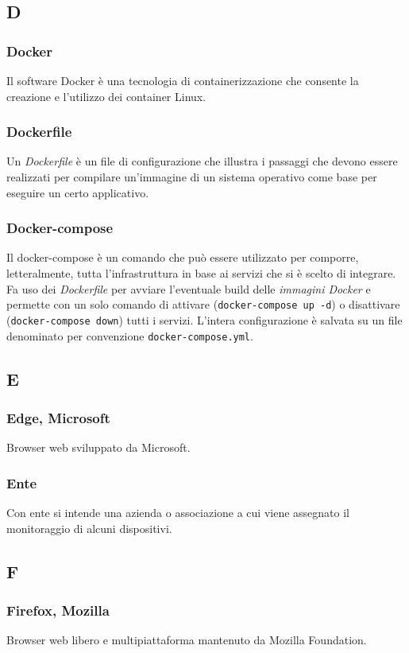 \subsection{D}
\subsubsection{Docker}  Il software Docker è una tecnologia di containerizzazione che consente la creazione e l'utilizzo dei container Linux.
\subsubsection{Dockerfile}  Un \textit{Dockerfile} è un file di configurazione che illustra i passaggi che devono essere realizzati per compilare un'immagine di un sistema operativo come base per eseguire un certo applicativo.
\subsubsection{Docker-compose}  Il docker-compose è un comando che può essere utilizzato per comporre, letteralmente, tutta l'infrastruttura in base ai servizi che si è scelto di integrare. Fa uso dei \textit{Dockerfile} per avviare l'eventuale build delle \textit{immagini Docker} e permette con un solo comando di attivare (\verb!docker-compose up -d!) o disattivare (\verb!docker-compose down!) tutti i servizi. L'intera configurazione è salvata su un file denominato per convenzione \verb!docker-compose.yml!.
\subsection{E}
\subsubsection*{Edge, Microsoft}
Browser web sviluppato da Microsoft.
\subsubsection*{Ente}
Con ente si intende una azienda o associazione a cui viene assegnato il monitoraggio di alcuni dispositivi.
\subsection{F}
\subsubsection*{Firefox, Mozilla}
Browser web libero e multipiattaforma mantenuto da Mozilla Foundation.
